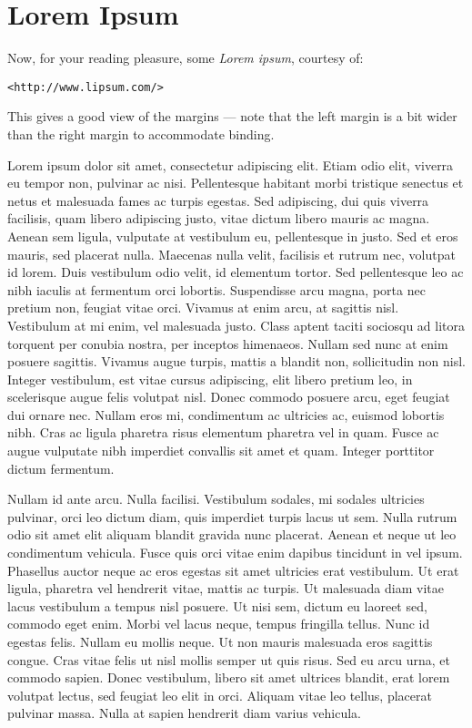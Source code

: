 \chapter{Lorem Ipsum}
\label{chap:ch4_abbr}
Now, for your reading pleasure, some \textsl{Lorem ipsum}, courtesy
of:
\begin{center}
\texttt{<http://www.lipsum.com/>}
\end{center}
This gives a good view of the margins --- note that the left margin
is a bit wider than the right margin to accommodate binding.

Lorem ipsum dolor sit amet, consectetur adipiscing elit. Etiam odio elit,
viverra eu tempor non, pulvinar ac nisi. Pellentesque habitant morbi
tristique senectus et netus et malesuada fames ac turpis egestas. Sed
adipiscing, dui quis viverra facilisis, quam libero adipiscing justo,
vitae dictum libero mauris ac magna. Aenean sem ligula, vulputate at
vestibulum eu, pellentesque in justo. Sed et eros mauris, sed placerat
nulla. Maecenas nulla velit, facilisis et rutrum nec, volutpat id
lorem. Duis vestibulum odio velit, id elementum tortor. Sed pellentesque
leo ac nibh iaculis at fermentum orci lobortis. Suspendisse arcu magna,
porta nec pretium non, feugiat vitae orci. Vivamus at enim arcu,
at sagittis nisl. Vestibulum at mi enim, vel malesuada justo. Class
aptent taciti sociosqu ad litora torquent per conubia nostra, per
inceptos himenaeos. Nullam sed nunc at enim posuere sagittis. Vivamus
augue turpis, mattis a blandit non, sollicitudin non nisl. Integer
vestibulum, est vitae cursus adipiscing, elit libero pretium leo,
in scelerisque augue felis volutpat nisl. Donec commodo posuere arcu,
eget feugiat dui ornare nec. Nullam eros mi, condimentum ac ultricies ac,
euismod lobortis nibh. Cras ac ligula pharetra risus elementum pharetra
vel in quam. Fusce ac augue vulputate nibh imperdiet convallis sit amet
et quam. Integer porttitor dictum fermentum.

Nullam id ante arcu. Nulla facilisi. Vestibulum sodales, mi sodales
ultricies pulvinar, orci leo dictum diam, quis imperdiet turpis lacus
ut sem. Nulla rutrum odio sit amet elit aliquam blandit gravida nunc
placerat. Aenean et neque ut leo condimentum vehicula. Fusce quis orci
vitae enim dapibus tincidunt in vel ipsum. Phasellus auctor neque ac eros
egestas sit amet ultricies erat vestibulum. Ut erat ligula, pharetra
vel hendrerit vitae, mattis ac turpis. Ut malesuada diam vitae lacus
vestibulum a tempus nisl posuere. Ut nisi sem, dictum eu laoreet sed,
commodo eget enim. Morbi vel lacus neque, tempus fringilla tellus. Nunc
id egestas felis. Nullam eu mollis neque. Ut non mauris malesuada
eros sagittis congue. Cras vitae felis ut nisl mollis semper ut quis
risus. Sed eu arcu urna, et commodo sapien. Donec vestibulum, libero
sit amet ultrices blandit, erat lorem volutpat lectus, sed feugiat leo
elit in orci. Aliquam vitae leo tellus, placerat pulvinar massa. Nulla
at sapien hendrerit diam varius vehicula.

